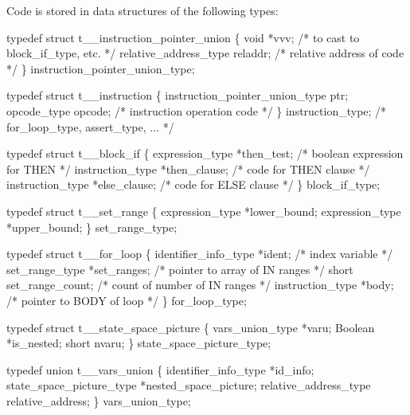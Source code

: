 Code is stored in data structures of the following types:
\begin{codeexample}
typedef struct t__instruction_pointer_union
   \{
       void *vvv;                      /* to cast to block_if_type, etc. */
       relative_address_type reladdr;  /* relative address of code */
   \} instruction_pointer_union_type;
\end{codeexample}

\begin{codeexample}
typedef struct t__instruction
   \{
       instruction_pointer_union_type ptr;
       opcode_type opcode;      /* instruction operation code */
   \} instruction_type;          /*    for_loop_type, assert_type, ... */
\end{codeexample}

\begin{codeexample}
typedef struct t__block_if
   \{
       expression_type *then_test;    /* boolean expression for THEN */
       instruction_type *then_clause; /* code for THEN clause */
       instruction_type *else_clause; /* code for ELSE clause */
   \} block_if_type;
\end{codeexample}

\begin{codeexample}
typedef struct t__set_range
   \{
       expression_type *lower_bound;
       expression_type *upper_bound;
   \} set_range_type;
\end{codeexample}

\begin{codeexample}
typedef struct t__for_loop
   \{
       identifier_info_type *ident;  /* index variable */
       set_range_type *set_ranges;   /* pointer to array of IN ranges */
       short set_range_count;        /* count of number of IN ranges */
       instruction_type *body;       /* pointer to BODY of loop */
   \} for_loop_type;
\end{codeexample}

\begin{codeexample}
typedef struct t__state_space_picture
   \{
       vars_union_type *varu;
       Boolean *is_nested;
       short nvaru;
   \} state_space_picture_type;
\end{codeexample}

\begin{codeexample}
typedef union t__vars_union
   \{
       identifier_info_type *id_info;
       state_space_picture_type *nested_space_picture;
       relative_address_type relative_address;
   \} vars_union_type;
\end{codeexample}


